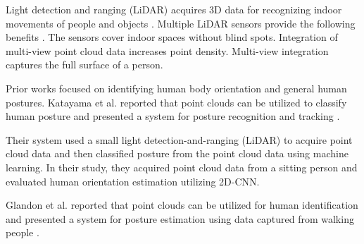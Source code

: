 \begin{revisedblock}
Light detection and ranging (LiDAR) acquires 3D data for recognizing indoor movements of people and objects \cite{9795869,oka2021spatial,10159661}.
Multiple LiDAR sensors provide the following benefits \cite{oka2021spatial,10159661}.
  The sensors cover indoor spaces without blind spots.
  Integration of multi-view point cloud data increases point density.
  Multi-view integration captures the full surface of a person.
\end{revisedblock}

Prior works focused on identifying human body orientation and general human postures.
Katayama et al. reported that point clouds can be utilized to classify human posture and presented a system for posture recognition and tracking \cite{9767292}. 
    \begin{deletedblock}
    Their system used a small light detection-and-ranging (LiDAR) to acquire point cloud data and then classified posture from the point cloud data using machine learning. 
    In their study, they acquired point cloud data from a sitting person and evaluated human orientation estimation utilizing 2D-CNN. 
    \end{deletedblock}
Glandon et al. reported that point clouds can be utilized for human identification and presented a system for posture estimation using data captured from walking people \cite{8852370}. 
